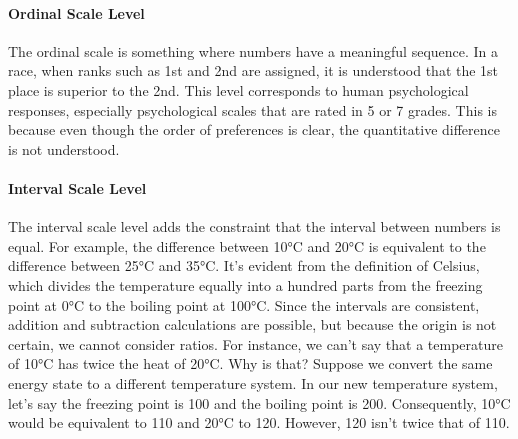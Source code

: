 \documentclass{ltjsbook}
\begin{document}
\paragraph{Ordinal Scale Level} The ordinal scale is something where numbers have a meaningful sequence. In a race, when ranks such as 1st and 2nd are assigned, it is understood that the 1st place is superior to the 2nd. This level corresponds to human psychological responses, especially psychological scales that are rated in 5 or 7 grades. This is because even though the order of preferences is clear, the quantitative difference is not understood.


\paragraph{Interval Scale Level} The interval scale level adds the constraint that the interval between numbers is equal. For example, the difference between 10°C and 20°C is equivalent to the difference between 25°C and 35°C. It's evident from the definition of Celsius, which divides the temperature equally into a hundred parts from the freezing point at 0°C to the boiling point at 100°C. Since the intervals are consistent, addition and subtraction calculations are possible, but because the origin is not certain, we cannot consider ratios. For instance, we can't say that a temperature of 10°C has twice the heat of 20°C. Why is that? Suppose we convert the same energy state to a different temperature system. In our new temperature system, let's say the freezing point is 100 and the boiling point is 200. Consequently, 10°C would be equivalent to 110 and 20°C to 120. However, 120 isn't twice that of 110.
\end{document}
